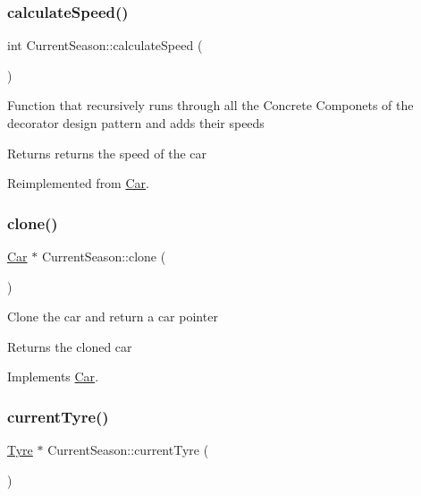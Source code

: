 \subsubsection{\texorpdfstring{calculate\+Speed()}{calculateSpeed()}}
{\footnotesize\ttfamily int Current\+Season\+::calculate\+Speed (\begin{DoxyParamCaption}{ }\end{DoxyParamCaption})\hspace{0.3cm}{\ttfamily [virtual]}}

Function that recursively runs through all the Concrete Componets of the decorator design pattern and adds their speeds \begin{DoxyReturn}{Returns}
returns the speed of the car 
\end{DoxyReturn}


Reimplemented from \hyperlink{classCar_aadb72568edbdf571547ec48e9781237f}{Car}.

\mbox{\label{classCurrentSeason_afaed34051750fdd603784e6ea7809075}} 
\subsubsection{\texorpdfstring{clone()}{clone()}}
{\footnotesize\ttfamily \hyperlink{classCar}{Car} $\ast$ Current\+Season\+::clone (\begin{DoxyParamCaption}{ }\end{DoxyParamCaption})\hspace{0.3cm}{\ttfamily [virtual]}}

Clone the car and return a car pointer \begin{DoxyReturn}{Returns}
the cloned car 
\end{DoxyReturn}


Implements \hyperlink{classCar_a5a54bbfe8e72022f4d9fdf6ecc990d99}{Car}.

\mbox{\label{classCurrentSeason_a9ea661b3a870ecb22026d9a3c7343a8f}} 
\subsubsection{\texorpdfstring{current\+Tyre()}{currentTyre()}}
{\footnotesize\ttfamily \hyperlink{classTyre}{Tyre} $\ast$ Current\+Season\+::current\+Tyre (\begin{DoxyParamCaption}{ }\end{DoxyParamCaption})\hspace{0.3cm}{\ttfamily [virtual]}}

